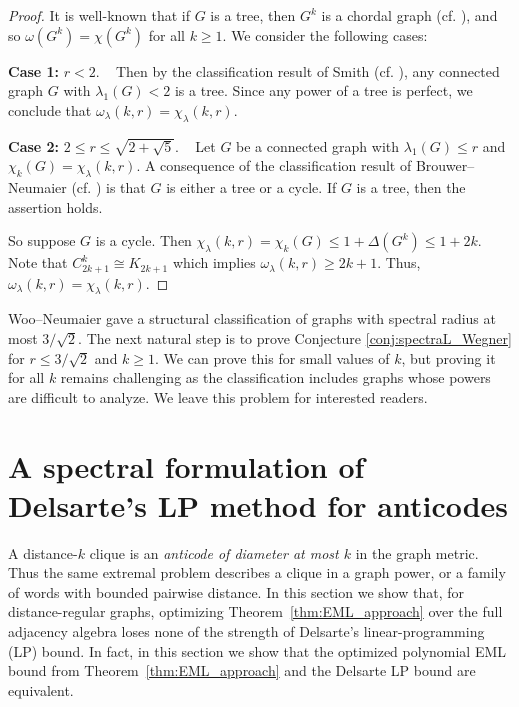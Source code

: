 \documentclass[10pt,a4paper]{article}
\theoremstyle{plain}
\numberwithin{equation}{section}
\begin{document}
\begin{proof}  It is well-known that if $G$ is a tree, then $G^k$ is a chordal graph (cf. \cite{Agnarsson_Halldorsson_2007}), and so $\omega(G^k) = \chi(G^k)$ for all $k\ge 1$. We consider the following cases:

\textbf{Case 1:} $r < 2$. ~ Then by the classification result of Smith \cite{Smith_1970} (cf. \cite[Theorem 3.1.3]{Brouwer_Haemers_2012}), any connected graph $G$ with $\lambda_1(G)<2$ is a tree. Since any power of a tree is perfect, we conclude that $\omega_\lambda(k,r) = \chi_\lambda(k,r)$.

\textbf{Case 2:} $2\le r\le \sqrt{2+\sqrt{5}}$. ~ Let $G$ be a connected graph with $\lambda_1(G)\le r$ and $\chi_k(G) = \chi_\lambda(k,r)$. A consequence of the classification result of Brouwer--Neumaier \cite{Brouwer_Neumaier_1989} (cf. \cite{Cvetkovic_Doob_Gutman_1982}) is that $G$ is either a tree or a cycle. If $G$ is a tree, then the assertion holds. 

So suppose $G$ is a cycle. Then $\chi_\lambda(k,r) =\chi_k(G)\le 1 + \Delta(G^k) \le 1 + 2k$. Note that $C_{2k+1}^k \cong K_{2k+1}$ which implies $\omega_\lambda(k,r)\ge 2k+1$. Thus, $\omega_\lambda(k,r) = \chi_\lambda(k,r)$. 
\end{proof}

Woo--Neumaier \cite{Woo_Neumaier_2007} gave a structural classification of graphs with spectral radius at most $3/\sqrt{2}$. The next natural step is to prove Conjecture \ref{conj:spectraL_Wegner} for $r\le 3/\sqrt{2}$ and $k\ge 1$. We can prove this for small values of $k$, but proving it for all $k$ remains challenging as the classification includes graphs whose powers are difficult to analyze. We leave this problem for interested readers. 

\section{A spectral formulation of Delsarte's LP method for anticodes}\label{sec:coding} 
A distance-$k$ clique is an \emph{anticode of diameter at most $k$} in the graph metric. Thus the same extremal problem describes a clique in a graph power, or a family of words with bounded pairwise distance. In this section we show that, for distance-regular graphs, optimizing Theorem~\ref{thm:EML_approach} over the full adjacency algebra loses none of the strength of Delsarte's linear-programming (LP) bound. In fact, in this section we show that the optimized polynomial EML bound from Theorem~\ref{thm:EML_approach} and the Delsarte LP bound are equivalent.
\end{document}
